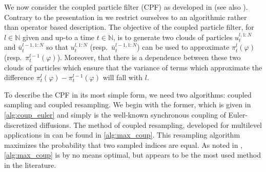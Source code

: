 \documentclass[english]{article}
\begin{document}
We now consider the coupled particle filter (CPF) as developed in \cite{mlpf,mlpf_nc} (see also \cite{mlpf_new}). Contrary to the presentation in \cite{jasra} we restrict ourselves to an algorithmic rather than operator based description. The objective of the coupled particle filter, for $l\in\mathbb{N}$ given and up-to a time $t\in\mathbb{N}$, is to generate two clouds of particles $u_{t}^{l,1:N}$ and $\bar{u}_{t}^{l-1,1:N}$ so that $u_{t}^{l,1:N}$ (resp.~$\bar{u}_{t}^{l-1,1:N}$) can be used to approximate $\pi_t^l(\varphi)$ (resp.~$\pi_t^{l-1}(\varphi)$). Moreover, that there is a dependence between these two clouds of particles which ensure that the variance of terms which approximate the difference $\pi_t^l(\varphi)-\pi_t^{l-1}(\varphi)$ will
fall with $l$. 

To describe the CPF in its most simple form, we need two algorithms: coupled sampling and coupled resampling.
We begin with the former, which is given in \autoref{alg:coup_euler} and simply is the well-known synchronous coupling of Euler-discretized diffusions. The method of coupled resampling, developed for multilevel applications in \cite{mlpf} can be found in \autoref{alg:max_coup}. This resampling algorithm maximizes the probability that two sampled indices are equal. As noted in \cite{jasra_clt}, \autoref{alg:max_coup} is by no means optimal, but appears to be the most used method in the literature.
\end{document}
